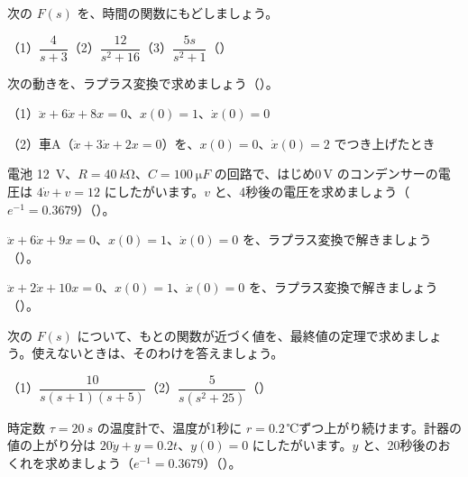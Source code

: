 \bkendproblems
{}

\bkproblem 次の $F(s)$ を、時間の関数にもどしましょう。\par
（1）\nobreak $\dfrac{4}{s+3}$\qquad（2）\nobreak $\dfrac{12}{s^2+16}$\qquad（3）\nobreak $\dfrac{5s}{s^2+1}$\mbox{（）}

\bkproblem 次の動きを、ラプラス変換で求めましょう\mbox{（）}。\par
（1）\nobreak $\ddot x+6\dot x+8x=0$、$x(0)=1$、$\dot x(0)=0$\par
（2）\nobreak 車A（$\ddot x+3\dot x+2x=0$）を、$x(0)=0$、$\dot x(0)=2$ でつき上げたとき

\bkproblem 電池 \qty{12}{V}、$R=\qty{40}{k\ohm}$、$C=\qty{100}{\micro F}$ の回路で、はじめ0\,V のコンデンサーの電圧は $4\dot v+v=12$ にしたがいます。$v$ と、4秒後の電圧を求めましょう（$e^{-1}=0.3679$）\mbox{（）}。

\bkproblem $\ddot x+6\dot x+9x=0$、$x(0)=1$、$\dot x(0)=0$ を、ラプラス変換で解きましょう\mbox{（）}。

\bkproblem $\ddot x+2\dot x+10x=0$、$x(0)=1$、$\dot x(0)=0$ を、ラプラス変換で解きましょう\mbox{（）}。

\bkproblem 次の $F(s)$ について、もとの関数が近づく値を、最終値の定理で求めましょう。使えないときは、そのわけを答えましょう。\par
（1）\nobreak $\dfrac{10}{s(s+1)(s+5)}$\qquad（2）\nobreak $\dfrac{5}{s(s^2+25)}$\mbox{（）}

\bkproblem 時定数 $\tau=\qty{20}{s}$ の温度計で、温度が1秒に $r=0.2$\,℃ずつ上がり続けます。計器の値の上がり分は $20\dot y+y=0.2t$、$y(0)=0$ にしたがいます。$y$ と、20秒後のおくれを求めましょう（$e^{-1}=0.3679$）\mbox{（）}。

